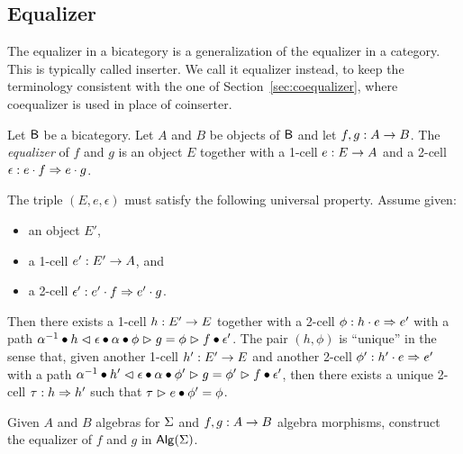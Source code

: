 \subsection{Equalizer}

The equalizer in a bicategory is a generalization of the equalizer in
a category. This is typically called inserter. We call it equalizer
instead, to keep the terminology consistent with the one of
Section~\ref{sec:coequalizer}, where coequalizer is used in place of
coinserter.

\begin{definition}
Let $\B$ be a bicategory. Let $A$ and $B$ be objects of $\B$ and let
$f,g : A \onecell B$. The \emph{equalizer} of $f$ and $g$ is an
object $E$ together with a 1-cell $e : E \onecell A$ and a 2-cell
$\epsilon : e \cdot f\twocell e \cdot g$.

The triple $(E,e,\epsilon)$ must satisfy the following universal
property. Assume given:
\begin{itemize}
\item an object $E'$,
\item a 1-cell $e' : E' \onecell A$, and
\item a 2-cell $\epsilon' : e' \cdot f \twocell e' \cdot g$.
\end{itemize}
Then there exists a 1-cell $h : E' \onecell E$ together with a 2-cell
$\phi : h \cdot e \twocell e'$ with a path $\rassoc{h}{e}{f} \vcomp
h \whiskerl \epsilon \vcomp \lassoc{h}{e}{g} \vcomp \phi \whiskerr g
= \phi \whiskerr f \vcomp \epsilon'$.
The pair $(h,\phi)$ is ``unique'' in the sense that,
given another 1-cell $h' : E' \onecell E$ and another 2-cell $\phi' :
h' \cdot e \twocell e'$ with a path $\rassoc{h'}{e}{f} \vcomp
h' \whiskerl \epsilon \vcomp \lassoc{h'}{e}{g} \vcomp \phi' \whiskerr g
= \phi' \whiskerr f \vcomp \epsilon'$, then there exists a unique 2-cell $\tau : h
\twocell h'$ such that $\tau \whiskerr e \vcomp \phi' = \phi$.
\end{definition}

\begin{problem}
\label{prob:equalizer}
Given $A$ and $B$ algebras for $\sign$ and $f,g : A \onecell B$
algebra morphisms, construct the equalizer of $f$ and $g$ in $\alg(\sign)$.
\end{problem}

